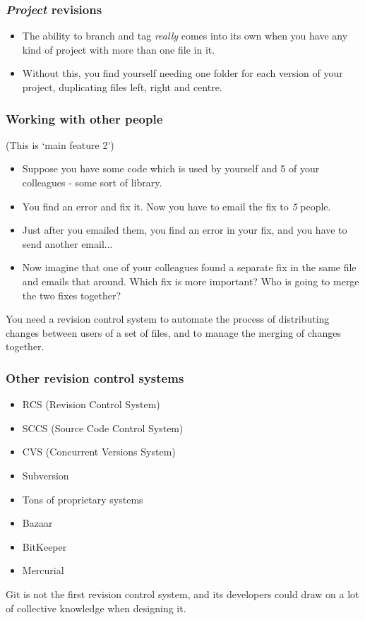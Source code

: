 \documentclass{beamer}
\begin{document}
\begin{frame}
  \frametitle{\emph{Project} revisions}
  \begin{itemize}
    \item The ability to branch and tag \emph{really} comes into its own when
      you have any kind of project with more than one file in it.

    \item Without this, you find yourself needing one folder for
      each version of your project, duplicating files left, right
      and centre.
  \end{itemize}

\end{frame}

\begin{frame}
  \frametitle{Working with other people}
  (This is `main feature 2')

  \begin{itemize}
    \item Suppose you have some code which is used by yourself and 5 of your
      colleagues - some sort of library.

    \pause \item You find an error and fix it. Now you have to email the fix to \emph{5} people.

    \pause \item Just after you emailed them, you find an error in your fix, and you
    have to send another email...

    \pause \item Now imagine that one of your colleagues found a
    separate fix in the same file and emails that around. Which fix is
    more important? Who is going to merge the two fixes together?
  \end{itemize}

  \pause You need a revision control system to automate the process of
  distributing changes between users of a set of files, and to manage
  the merging of changes together.
\end{frame}

\begin{frame}
  \frametitle{Other revision control systems}
  \begin{itemize}
  \item RCS (Revision Control System)
  \item SCCS (Source Code Control System)
  \item CVS (Concurrent Versions System)
  \item Subversion
  \item Tons of proprietary systems
  \item Bazaar
  \item BitKeeper
  \item Mercurial
  \end{itemize}

  \pause Git is not the first revision control system, and its
  developers could draw on a lot of collective knowledge when
  designing it.
\end{frame}
\end{document}
